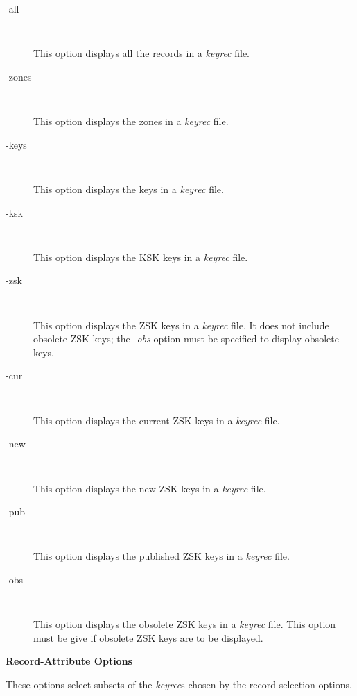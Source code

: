 \begin{description}

\item [-all]\verb" "

This option displays all the records in a {\it keyrec} file.

\item [-zones]\verb" "

This option displays the zones in a {\it keyrec} file.

\item [-keys]\verb" "

This option displays the keys in a {\it keyrec} file.

\item [-ksk]\verb" "

This option displays the KSK keys in a {\it keyrec} file.

\item [-zsk]\verb" "

This option displays the ZSK keys in a {\it keyrec} file.  It does not include
obsolete ZSK keys; the {\it -obs} option must be specified to display obsolete
keys.

\item [-cur]\verb" "

This option displays the current ZSK keys in a {\it keyrec} file.

\item [-new]\verb" "

This option displays the new ZSK keys in a {\it keyrec} file.

\item [-pub]\verb" "

This option displays the published ZSK keys in a {\it keyrec} file.

\item [-obs]\verb" "

This option displays the obsolete ZSK keys in a {\it keyrec} file.  This option
must be give if obsolete ZSK keys are to be displayed.

\end{description}

{\bf Record-Attribute Options}

These options select subsets of the {\it keyrec}s chosen by the
record-selection options. 

